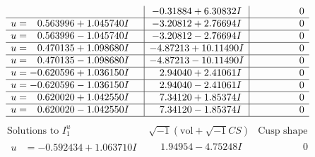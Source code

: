 \documentclass[1p]{elsarticle_modified}
\theoremstyle{definition}
\newcommand{\I}{\sqrt{-1}}
\begin{document}
$$\begin{array}{c|c|c}
 & -0.31884 + 6.30832 I & \phantom{-0.000000 } 0 \\ \hline\begin{aligned}
u &= \phantom{-}0.563996 + 1.045740 I\end{aligned}
 & -3.20812 + 2.76694 I & \phantom{-0.000000 } 0 \\ \hline\begin{aligned}
u &= \phantom{-}0.563996 - 1.045740 I\end{aligned}
 & -3.20812 - 2.76694 I & \phantom{-0.000000 } 0 \\ \hline\begin{aligned}
u &= \phantom{-}0.470135 + 1.098680 I\end{aligned}
 & -4.87213 + 10.11490 I & \phantom{-0.000000 } 0 \\ \hline\begin{aligned}
u &= \phantom{-}0.470135 - 1.098680 I\end{aligned}
 & -4.87213 - 10.11490 I & \phantom{-0.000000 } 0 \\ \hline\begin{aligned}
u &= -0.620596 + 1.036150 I\end{aligned}
 & \phantom{-}2.94040 + 2.41061 I & \phantom{-0.000000 } 0 \\ \hline\begin{aligned}
u &= -0.620596 - 1.036150 I\end{aligned}
 & \phantom{-}2.94040 - 2.41061 I & \phantom{-0.000000 } 0 \\ \hline\begin{aligned}
u &= \phantom{-}0.620020 + 1.042550 I\end{aligned}
 & \phantom{-}7.34120 + 1.85374 I & \phantom{-0.000000 } 0 \\ \hline\begin{aligned}
u &= \phantom{-}0.620020 - 1.042550 I\end{aligned}
 & \phantom{-}7.34120 - 1.85374 I & \phantom{-0.000000 } 0\\
 \hline 
 \end{array}$$\newpage$$\begin{array}{c|c|c}  
\text{Solutions to }I^u_{1}& \I (\text{vol} + \sqrt{-1}CS) & \text{Cusp shape}\\
 \hline 
\begin{aligned}
u &= -0.592434 + 1.063710 I\end{aligned}
 & \phantom{-}1.94954 - 4.75248 I & \phantom{-0.000000 } 0 \\ \hline\begin{aligned}

\end{aligned}
\end{array}$$
\end{document}
